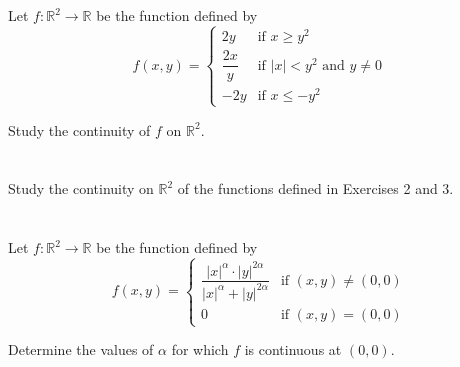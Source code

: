 \documentclass[12pt]{article}
\begin{document}
\begin{correctionbox}

\end{correctionbox}

\section{}
Let $f : \mathbb{R}^2 \to \mathbb{R}$ be the function defined by
$$f(x, y) = \begin{cases}
2y & \text{if } x \geq y^2 \\[0.5em]
\dfrac{2x}{y} & \text{if } |x| < y^2 \text{ and } y \neq 0 \\[0.5em]
-2y & \text{if } x \leq -y^2
\end{cases}$$

Study the continuity of $f$ on $\mathbb{R}^2$.

\begin{correctionbox}

\end{correctionbox}

\section{}
Study the continuity on $\mathbb{R}^2$ of the functions defined in Exercises 2 and 3.

\begin{correctionbox}

\end{correctionbox}

\section{}
Let $f : \mathbb{R}^2 \to \mathbb{R}$ be the function defined by
$$f(x, y) = \begin{cases}
\dfrac{|x|^\alpha \cdot |y|^{2\alpha}}{|x|^\alpha + |y|^{2\alpha}} & \text{if } (x, y) \neq (0, 0) \\[0.5em]
0 & \text{if } (x, y) = (0, 0)
\end{cases}$$

Determine the values of $\alpha$ for which $f$ is continuous at $(0, 0)$.

\begin{correctionbox}

\end{correctionbox}
\end{document}
